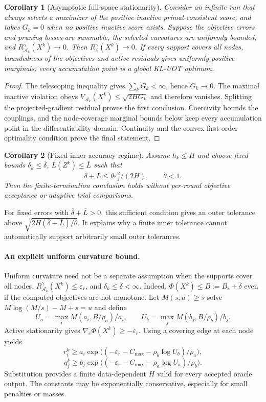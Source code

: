 \documentclass[11pt]{article}
\newtheorem{corollary}{Corollary}
\begin{document}
\begin{corollary}[Asymptotic full-space stationarity]
Consider an infinite run that always selects a maximizer of the positive inactive primal-consistent score, and takes $G_k=0$ when no positive inactive score exists.
Suppose the objective errors and pruning losses are summable, the selected curvatures are uniformly bounded, and $R_{\mathcal A_k}^{\gamma}(X^k)\to0$.
Then $R_{\mathcal E}^{\gamma}(X^k)\to0$.
If every support covers all nodes, boundedness of the objectives and active residuals gives uniformly positive marginals; every accumulation point is a global KL-UOT optimum.
\end{corollary}
\begin{proof}
The telescoping inequality gives $\sum_kG_k<\infty$, hence $G_k\to0$.
The maximal inactive violation obeys $V_{\mathcal A_k}(X^k)\leq\sqrt{2HG_k}$ and therefore vanishes.
Splitting the projected-gradient residual proves the first conclusion.
Coercivity bounds the couplings, and the node-coverage marginal bounds below keep every accumulation point in the differentiability domain.
Continuity and the convex first-order optimality condition prove the final statement.
\end{proof}

\begin{corollary}[Fixed inner-accuracy regime]
Assume $h_k\leq H$ and choose fixed bounds $\delta_k\leq\overline\delta$, $L(Z^k)\leq\overline L$ such that
$$\overline\delta+\overline L\leq\theta\varepsilon_f^2/(2H),\qquad\theta<1.$$
Then the finite-termination conclusion holds without per-round objective acceptance or adaptive trial comparisons.
\end{corollary}
For fixed errors with $\overline\delta+\overline L>0$, this sufficient condition gives an outer tolerance above $\sqrt{2H(\overline\delta+\overline L)/\theta}$.
It explains why a finite inner tolerance cannot automatically support arbitrarily small outer tolerances.

\paragraph{An explicit uniform curvature bound.}
Uniform curvature need not be a separate assumption when the supports cover all nodes, $R_{\mathcal A_k}^{\gamma}(X^k)\leq\varepsilon_r$, and $\delta_k\leq\overline\delta<\infty$.
Indeed, $\Phi(X^k)\leq B:=B_{\mathrm z}+\overline\delta$ even if the computed objectives are not monotone.
Let $M(s,u)\geq s$ solve $M\log(M/s)-M+s=u$ and define
$$U_a=\max_i M(a_i,B/\rho_a)/a_i,\qquad U_b=\max_j M(b_j,B/\rho_b)/b_j.$$
Active stationarity gives $\nabla_e\Phi(X^k)\geq-\varepsilon_r$.
Using a covering edge at each node yields
$$r_i^k\geq a_i\exp\big((-\varepsilon_r-C_{\max}-\rho_b\log U_b)/\rho_a\big),$$
$$q_j^k\geq b_j\exp\big((-\varepsilon_r-C_{\max}-\rho_a\log U_a)/\rho_b\big).$$
Substitution provides a finite data-dependent $H$ valid for every accepted oracle output.
The constants may be exponentially conservative, especially for small penalties or masses.
\end{document}
